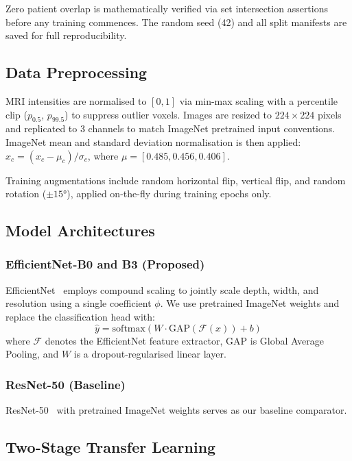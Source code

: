 \documentclass[journal]{IEEEtran}
\begin{document}
Zero patient overlap is mathematically verified via set intersection assertions before any training
commences. The random seed (42) and all split manifests are saved for full reproducibility.

\subsection{Data Preprocessing}

MRI intensities are normalised to $[0,1]$ via min-max scaling with a percentile clip ($p_{0.5}$,
$p_{99.5}$) to suppress outlier voxels. Images are resized to $224 \times 224$ pixels and
replicated to 3 channels to match ImageNet pretrained input conventions. ImageNet mean and
standard deviation normalisation is then applied:
$\hat{x}_c = (x_c - \mu_c) / \sigma_c$, where $\mu = [0.485, 0.456, 0.406]$.

Training augmentations include random horizontal flip, vertical flip, and random rotation
($\pm 15°$), applied on-the-fly during training epochs only.

\subsection{Model Architectures}

\subsubsection{EfficientNet-B0 and B3 (Proposed)}

EfficientNet~\cite{tan2019efficientnet} employs compound scaling to jointly scale depth, width,
and resolution using a single coefficient $\phi$. We use pretrained ImageNet weights and replace
the classification head with:
\begin{equation}
  \hat{y} = \text{softmax}(W \cdot \text{GAP}(\mathcal{F}(x)) + b)
\end{equation}
where $\mathcal{F}$ denotes the EfficientNet feature extractor, $\text{GAP}$ is Global Average
Pooling, and $W$ is a dropout-regularised linear layer.

\subsubsection{ResNet-50 (Baseline)}

ResNet-50~\cite{he2016resnet} with pretrained ImageNet weights serves as our baseline comparator.

\subsection{Two-Stage Transfer Learning}
\end{document}

